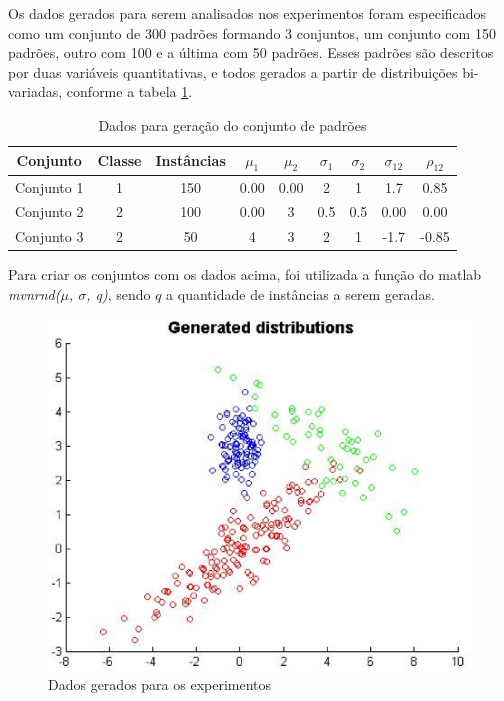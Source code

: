
Os dados gerados para serem analisados nos experimentos foram especificados como um conjunto de 300 padrões formando 3 conjuntos, um conjunto com 150 padrões, outro com 100 e a última com 50 padrões. Esses padrões são descritos por duas variáveis quantitativas, e todos gerados a partir de distribuições bi-variadas, conforme a tabela \ref{tab:dados}.

\begin{table}[H]
\begin{center}
\begin{tabular}{|c|c|c|c|c|c|c|c|c|}
\hline
Conjunto 				& 	Classe	&	Instâncias	&	$\mu_1$	&	$\mu_2$	&	$\sigma_1$	&	$\sigma_2$	&	$\sigma_{12}$	&	$\rho_{12}$	\\
\hline %
Conjunto 1           	&	1		&  		150		&	0.00   	&   0.00    &   	2   	&		1   	&		1.7		&		0.85	\\
Conjunto 2     			&   2		&   	100		&	0.00	&   3		&   	0.5		&   	0.5   	&		0.00	&		0.00	\\
Conjunto 3     			&   2		&   	50		&	4		&   3		&   	2		&   	1   	&		-1.7	&		-0.85	\\
\hline
\end{tabular}%
\end{center}   %
\caption{Dados para geração do conjunto de padrões}
\label{tab:dados}
\end{table}

Para criar os conjuntos com os dados acima, foi utilizada a função do matlab \textit{mvnrnd($\mu$, $\sigma$, q)}, sendo $q$ a quantidade de instâncias a serem geradas.

\begin{figure}[H]
\center
\includegraphics[scale=0.60]{imagens/tecnicas/generatedDistributions.eps}
\caption{Dados gerados para os experimentos}
\label{fig:dados}
\end{figure}



